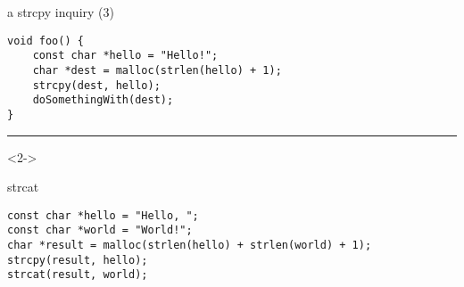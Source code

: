 \begin{frame}[fragile,label=strcpyLeak]{a strcpy inquiry (3)}
\lstset{
    language=C++,style=small
}
\begin{lstlisting}
void foo() {
    const char *hello = "Hello!";
    char *dest = malloc(strlen(hello) + 1);
    strcpy(dest, hello);
    doSomethingWith(dest);
}
\end{lstlisting}
\hrule
\begin{visibleenv}<2->
\end{visibleenv}
\end{frame}

\begin{frame}[fragile,label=strcatCode]{strcat}
\lstset{
    language=C++,style=small
}
\begin{lstlisting}
const char *hello = "Hello, ";
const char *world = "World!";
char *result = malloc(strlen(hello) + strlen(world) + 1);
strcpy(result, hello);
strcat(result, world);
\end{lstlisting}
\end{frame}
